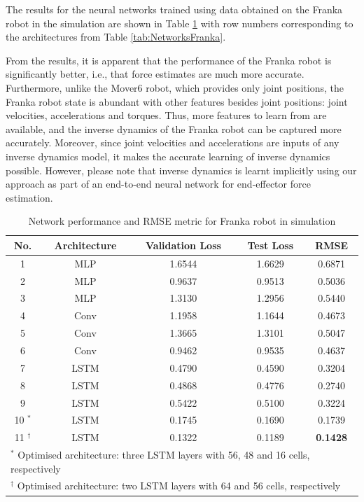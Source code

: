The results for the neural networks trained using data obtained on the Franka robot in the simulation are shown in  Table \ref{tab:ResultsFranka} with row numbers corresponding to the architectures from Table \ref{tab:NetworksFranka}. 

From the results, it is apparent that the performance of the Franka robot is significantly better, i.e., that force estimates are much more accurate. Furthermore, unlike the Mover6 robot, which provides only joint positions, the Franka robot state is abundant with other features besides joint positions: joint velocities, accelerations and torques. Thus, more features to learn from are available, and the inverse dynamics of the Franka robot can be captured more accurately. Moreover, since joint velocities and accelerations are inputs of any inverse dynamics model, it makes the accurate learning of inverse dynamics possible. However, please note that inverse dynamics is learnt implicitly using our approach as part of an end-to-end neural network for end-effector force estimation.

\begin{table}
    \caption[Networks performance and RMSE metric for Franka robot (simulation)]{Network performance and RMSE metric for Franka robot in simulation}
    \label{tab:ResultsFranka}
    \centering
    \begin{tabular}{ccccc}
        \toprule
        \textbf{No.} & \textbf{Architecture} & \textbf{Validation Loss} & \textbf{Test Loss} & \textbf{RMSE} \\
        \midrule
        1 & MLP & 1.6544 & 1.6629 & 0.6871\\ %
        2 & MLP &  0.9637 & 0.9513 & 0.5036\\ %
        3 & MLP & 1.3130 & 1.2956 & 0.5440\\ %
        4 & Conv & 1.1958 & 1.1644 & 0.4673\\ %
        5 & Conv & 1.3665 & 1.3101 & 0.5047\\ %
        6 & Conv & 0.9462 & 0.9535 & 0.4637\\ %
        7 & LSTM & 0.4790 & 0.4590 & 0.3204\\ %
        8 & LSTM & 0.4868 & 0.4776 & 0.2740\\ %
        9 & LSTM & 0.5422 & 0.5100 & 0.3224\\ %
        \midrule
        10 $^*$ & LSTM & 0.1745 & 0.1690 & 0.1739 \\
        11 $^\dagger$ & LSTM & 0.1322 & 0.1189 & \textbf{0.1428}\\
        \bottomrule
        \multicolumn{5}{l}{\footnotesize{$^*$ Optimised architecture: three LSTM layers with 56, 48 and 16 cells, respectively }}\\
        \multicolumn{5}{l}{\footnotesize{$^\dagger$ Optimised architecture: two LSTM layers with 64 and 56 cells, respectively}}
    \end{tabular}
\end{table}


